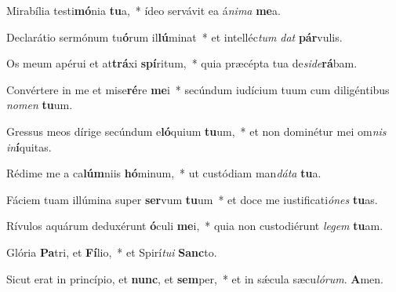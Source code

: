 \item Mirabília testi\textbf{mó}nia \textbf{tu}a,~* ídeo servávit ea á\textit{ni}\textit{ma} \textbf{me}a.

\item Declarátio sermónum tu\textbf{ó}rum il\textbf{lú}minat~* et intelléc\textit{tum} \textit{dat} \textbf{pár}vulis.

\item Os meum apérui et at\textbf{trá}xi \textbf{spí}ritum,~* quia præcépta tua de\textit{si}\textit{de}\textbf{rá}bam.

\item Convértere in me et mise\textbf{ré}re \textbf{me}i~* secúndum iudícium tuum cum diligéntibus \textit{no}\textit{men} \textbf{tu}um.

\item Gressus meos dírige secúndum e\textbf{ló}quium \textbf{tu}um,~* et non dominétur mei om\textit{nis} \textit{in}\textbf{í}quitas.

\item Rédime me a ca\textbf{lúm}niis \textbf{hó}minum,~* ut custódiam man\textit{dá}\textit{ta} \textbf{tu}a.

\item Fáciem tuam illúmina super \textbf{ser}vum \textbf{tu}um~* et doce me iustificati\textit{ó}\textit{nes} \textbf{tu}as.

\item Rívulos aquárum deduxérunt \textbf{ó}culi \textbf{me}i,~* quia non custodiérunt \textit{le}\textit{gem} \textbf{tu}am.

\item Glória \textbf{Pa}tri, et \textbf{Fí}lio,~* et Spirí\textit{tu}\textit{i} \textbf{Sanc}to.

\item Sicut erat in princípio, et \textbf{nunc}, et \textbf{sem}per,~* et in sǽcula sæcu\textit{ló}\textit{rum}. \textbf{A}men.